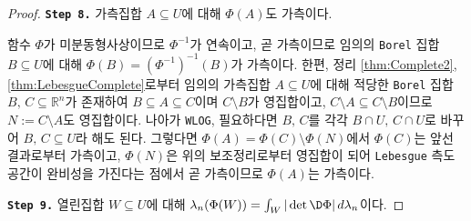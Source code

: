 \begin{proof}
    \noindent\texttt{\textbf{Step 8.}} 가측집합 $A\subseteq U$에 대해 $\Phi(A)$도 가측이다.

    함수 $\Phi$가 미분동형사상이므로 $\Phi^{-1}$가 연속이고, 곧 가측이므로 임의의 \texttt{Borel} 집합 $B\subseteq U$에 대해 $\Phi(B)=(\Phi^{-1})^{-1}(B)$가 가측이다. 한편, 정리 \ref{thm:Complete2}, \ref{thm:LebesgueComplete}로부터 임의의 가측집합 $A\subseteq U$에 대해 적당한 \texttt{Borel} 집합 $B,\,C\subseteq\mathbb{R}^n$가 존재하여 $B\subseteq A\subseteq C$이며 $C\setminus B$가 영집합이고, $C\setminus A\subseteq C\setminus B$이므로 $N:=C\setminus A$도 영집합이다. 나아가 \texttt{WLOG}, 필요하다면 $B,\,C$를 각각 $B\cap U,\,C\cap U$로 바꾸어 $B,\,C\subseteq U$라 해도 된다. 그렇다면 $\Phi(A)=\Phi(C)\setminus\Phi(N)$에서 $\Phi(C)$는 앞선 결과로부터 가측이고, $\Phi(N)$은 위의 보조정리로부터 영집합이 되어 \texttt{Lebesgue} 측도공간이 완비성을 가진다는 점에서 곧 가측이므로 $\Phi(A)$는 가측이다.

    \noindent\texttt{\textbf{Step 9.}} 열린집합 $W\subseteq U$에 대해 $\lambda_n(\Phi(W))=\int_W|\det\D\Phi|\,d\lambda_n$이다.


\end{proof}
